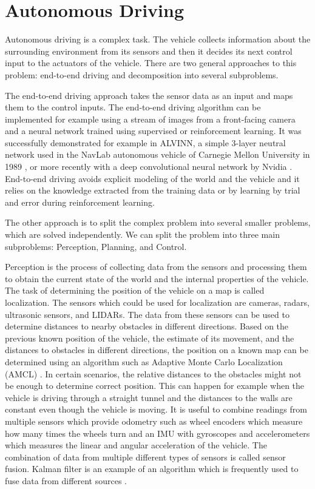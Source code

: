 \chapter{Autonomous Driving}

Autonomous driving is a complex task. The vehicle collects information about the surrounding environment from its sensors and then it decides its next control input to the actuators of the vehicle. There are two general approaches to this problem: end-to-end driving and decomposition into several subproblems.

The end-to-end driving approach takes the sensor data as an input and maps them to the control inputs. The end-to-end driving algorithm can be implemented for example using a stream of images from a front-facing camera and a neural network trained using supervised or reinforcement learning. It was successfully demonstrated for example in ALVINN, a simple 3-layer neutral network used in the NavLab autonomous vehicle of Carnegie Mellon University in 1989 \cite{ALVINN}, or more recently with a deep convolutional neural network by Nvidia \cite{Nvidia}. End-to-end driving avoids explicit modeling of the world and the vehicle and it relies on the knowledge extracted from the training data or by learning by trial and error during reinforcement learning.

The other approach is to split the complex problem into several smaller problems, which are solved independently. We can split the problem into three main subproblems: Perception, Planning, and Control.

Perception is the process of collecting data from the sensors and processing them to obtain the current state of the world and the internal properties of the vehicle. The task of determining the position of the vehicle on a map is called localization. The sensors which could be used for localization are cameras, radars, ultrasonic sensors, and LIDARs. The data from these sensors can be used to determine distances to nearby obstacles in different directions. Based on the previous known position of the vehicle, the estimate of its movement, and the distances to obstacles in different directions, the position on a known map can be determined using an algorithm such as Adaptive Monte Carlo Localization (AMCL) \cite{AMCL_position_estimation} \cite{AMCL_adaptive_sampling}. In certain scenarios, the relative distances to the obstacles might not be enough to determine correct position. This can happen for example when the vehicle is driving through a straight tunnel and the distances to the walls are constant even though the vehicle is moving. It is useful to combine readings from multiple sensors which provide odometry such as wheel encoders which measure how many times the wheels turn and an \gls*{IMU} with gyroscopes and accelerometers which measures the linear and angular acceleration of the vehicle. The combination of data from multiple different types of sensors is called sensor fusion. Kalman filter is an example of an algorithm which is frequently used to fuse data from different sources \cite{Kalman_filter}.

